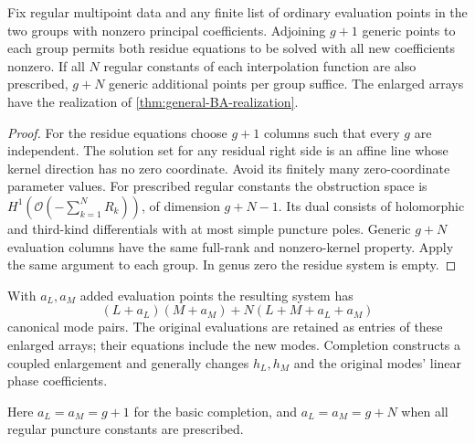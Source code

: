 \begin{corollary}\label{cor:BA-finite-list}
Fix regular multipoint data and any finite list of ordinary evaluation
points in the two groups with nonzero principal coefficients.
Adjoining $g+1$ generic points to each group permits both residue
equations to be solved with all new coefficients nonzero.
If all $N$ regular constants of each interpolation function are also
prescribed, $g+N$ generic additional points per group suffice.
The enlarged arrays have the realization of
\cref{thm:general-BA-realization}.
\end{corollary}
\begin{proof}
For the residue equations choose $g+1$ columns such that every $g$
are independent. The solution set for any residual right side is an
affine line whose kernel direction has no zero coordinate. Avoid its
finitely many zero-coordinate parameter values.
For prescribed regular constants the obstruction space is
$H^1(\mathcal O(-\sum_{k=1}^{N}R_k))$, of dimension $g+N-1$.
Its dual consists of holomorphic and third-kind differentials with
at most simple puncture poles. Generic $g+N$ evaluation columns have
the same full-rank and nonzero-kernel property. Apply the same argument
to each group. In genus zero the residue system is empty.
\end{proof}

With $a_L,a_M$ added evaluation points the resulting system has
\[
 (L+a_L)(M+a_M)+N(L+M+a_L+a_M)
\]
canonical mode pairs. The original evaluations are retained as
entries of these enlarged arrays; their equations include the new
modes. Completion constructs a coupled enlargement and generally
changes $h_L,h_M$ and the original modes' linear phase coefficients.

Here $a_L=a_M=g+1$ for the basic completion, and
$a_L=a_M=g+N$ when all regular puncture constants are prescribed.
